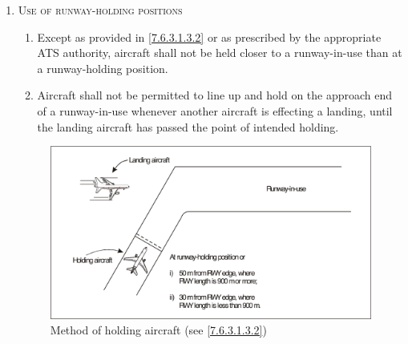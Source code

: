 \begin{enumeratesc}
\begin{enumerate}[labelindent=0pt,itemsep=0.2cm]
        \item \textsc{Use of runway-holding positions}
        \begin{enumerate}
            \item Except as provided in \ref{7.6.3.1.3.2} or as prescribed by the appropriate ATS authority, aircraft shall not be held closer to a runway-in-use than at a runway-holding position.
            \item \label{7.6.3.1.3.2} Aircraft shall not be permitted to line up and hold on the approach end of a runway-in-use whenever another aircraft is effecting a landing, until the landing aircraft has passed the point of intended holding.
        \end{enumerate}

        \vspace{0.5cm}
        \begin{figure}[!ht]
            \centering
            \includegraphics[width=14cm]{Images/Fig 7-2.png}
            \caption[Method of holding aircraft]{Method of holding aircraft (see \ref{7.6.3.1.3.2})}
            \label{fig:7-2}
        \end{figure}


\end{enumerate}
\end{enumeratesc}
